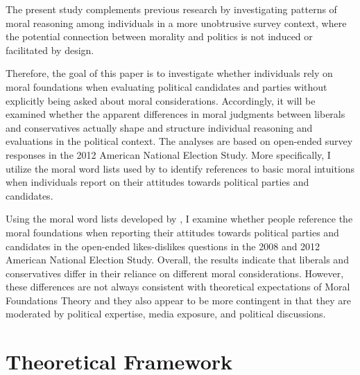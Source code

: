 \documentclass[12pt]{article}
\begin{document}

The present study complements previous research by investigating patterns of moral reasoning among individuals in a more unobtrusive survey context, where the potential connection between morality and politics is not induced or facilitated by design.


Therefore, the goal of this paper is to investigate whether individuals rely on moral foundations when evaluating political candidates and parties without explicitly being asked about moral considerations. Accordingly, it will be examined whether the apparent differences in moral judgments between liberals and conservatives actually shape and structure individual reasoning and evaluations in the political context. The analyses are based on open-ended survey responses in the 2012 American National Election Study. More specifically, I utilize the moral word lists used by \citet{graham2009liberals} to identify references to basic moral intuitions when individuals report on their attitudes towards political parties and candidates.

Using the moral word lists developed by \citet{graham2009liberals}, I examine whether people reference the moral foundations when reporting their attitudes towards political parties and candidates in the open-ended likes-dislikes questions in the 2008 and 2012 American National Election Study. Overall, the results indicate that liberals and conservatives differ in their reliance on different moral considerations. However, these differences are not always consistent with theoretical expectations of Moral Foundations Theory and they also appear to be more contingent in that they are moderated by political expertise, media exposure, and political discussions. 



\section{Theoretical Framework}
\end{document}

